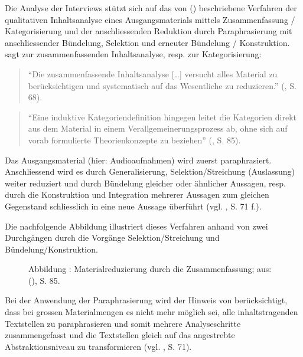 \documentclass[../../main.tex]{subfiles}
\begin{document}
\begin{sloppypar}
Die Analyse der Interviews stützt sich auf das von \citeauthor{mayring_qualitative_2015} (\citeyear{mayring_qualitative_2015}) beschriebene Verfahren der qualitativen Inhaltsanalyse eines Ausgangsmaterials mittels Zusammenfassung / Kategorisierung und der anschliessenden Reduktion durch Paraphrasierung mit anschliessender Bündelung, Selektion und erneuter Bündelung / Konstruktion. \citeauthor{mayring_qualitative_2015} sagt zur zusammenfassenden Inhaltsanalyse, resp. zur Kategorisierung:

\begin{quote}
"`Die zusammenfassende Inhaltsanalyse [\dots] versucht alles Material zu berücksichtigen und systematisch auf das Wesentliche zu reduzieren."' (\cite{mayring_qualitative_2015}, S. 68).
\end{quote}

\begin{quote}
"`Eine induktive Kategoriendefinition hingegen leitet die Kategorien direkt aus dem Material in einem Verallgemeinerungsprozess ab, ohne sich auf vorab formulierte Theorienkonzepte zu beziehen"' (\cite{mayring_qualitative_2015}, S. 85).
\end{quote}

Das Ausgangsmaterial (hier: Audioaufnahmen) wird zuerst paraphrasiert. Anschliessend wird es durch Generalisierung, Selektion/Streichung (Auslassung) weiter reduziert und durch Bündelung gleicher oder ähnlicher Aussagen, resp. durch die Konstruktion und Integration mehrerer Aussagen zum gleichen Gegenstand schliesslich in eine neue Aussage überführt (vgl. \citeauthor{mayring_qualitative_2015} \citeyear{mayring_qualitative_2015}, S. 71 f.).

Die nachfolgende Abbildung illustriert dieses Verfahren anhand von zwei Durchgängen durch die Vorgänge Selektion/Streichung und Bündelung/Konstruktion.

\addtocounter{figure}{1}
\begin{figure}[H]
 \centering
 
 \caption*{Abbildung \thefigure: Materialreduzierung durch die Zusammenfassung; aus: \citeauthor{mayring_qualitative_2015} (\citeyear{mayring_qualitative_2015}), S. 85.}
 \label{Materialreduzierung}
\end{figure}

Bei der Anwendung der Paraphrasierung wird der Hinweis von \citeauthor{mayring_qualitative_2015} berücksichtigt, dass bei grossen Materialmengen es nicht mehr möglich sei, alle inhaltstragenden Textstellen zu paraphrasieren und somit mehrere Analyseschritte zusammengefasst und die Textstellen gleich auf das angestrebte Abstraktionsniveau zu transformieren (vgl. \citeauthor{mayring_qualitative_2015} \citeyear{mayring_qualitative_2015}, S. 71).
\end{sloppypar}
\end{document}
